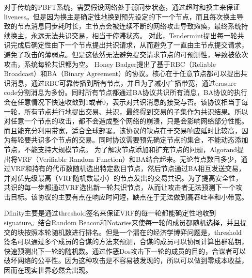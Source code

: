\documentclass[12pt, UTF8]{article}
\begin{document}
对于传统的PBFT\cite{castro1999practical, castro2002practical}系统，需要假设网络处于弱同步状态，通过超时和换主来保证liveness。但是因为换主是确定性地换到预先设定的下一个节点，而且每次换主导致的节点消息同步耗时长，主节点会被连续不断的网络攻击导致瘫痪，最终系统持续换主，永远无法共识交易，相当于停滞状态。
对此，Tendermint\cite{kwon2014tendermint}提出每一轮共识完成后确定性由下一个节点提出共识请求，从而避免了一直由主节点提交请求，避免了攻击的薄弱点。但是这依然无法避免提交请求节点的可预测性，导致被依次攻击，系统每轮共识都为空。
Honey Badger\cite{miller2016honey}提出了基于RBC（Reliable Broadcast）和BA（Binary Agreement）的协议。核心在于任意节点都可以提出共识消息，通过RBC可靠传播到所有节点，并且为了减小广播带宽，通过erasure code分割消息为多份。同时所有节点都通过BA协议共识所有消息，BA协议的执行会在任意情况下快速收敛到1或者0，表示对共识消息的接受与否。该协议相当于每一轮，所有节点并行地提出交易、共识，最终得到交易的子集作为共识结果。所以对任意一个节点的攻击，都不会造成整个网络的崩溃，只是会影响网络部分性能。而且能充分利用带宽，适合全球部署。该协议的缺点在于交易响应延时比较高，因为每轮要共识多个节点的交易。同时协议需要预先确定节点的集合，不能动态添加节点，不能支持大规模节点。
为了解决节点添加和扩充节点的问题，Algorand\cite{gilad2017algorand}提出将VRF（Verifiable Random Function）\cite{micali1999verifiable}和BA结合起来。无论节点数目多少，通过VRF和持有的代币数随机选出特定数目节点，然后节点通过BA相互发送交易，并对优先级最高（VRF随机数最小）的节点发出的交易共识。为了提高安全性，共识的每一步都通过VRF选出新一轮共识节点，从而让攻击者无法预测下一个攻击目标。该协议的主要有点在响应时间短，缺点在于无法做到高吞吐率和小带宽。

Dfinity\cite{hanke2018dfinity}主要是通过threshold签名来保证VRF的每一轮都能确定性地收到signature。结合Random Beacon和Notaries来使每一轮的成员都随机选择，并且提交的块按照本轮随机数进行排名。但是一个潜在的经济学博弈问题是，threshold签名可以通过多个成员的合谋的方法来预测，合谋的成员可以协同计算出群私钥，快速预测出下一轮的随机数。通过作恶Dos攻击下一轮的成员的目的，合谋者可以破坏网络的公平性。因为这种攻击是不容易被发现的，所以可以做到零成本收益，因而在现实世界必然会出现。


\end{document}
